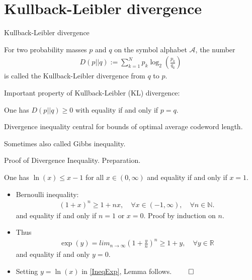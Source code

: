 \section{Kullback-Leibler divergence}
\begin{frame}{Kullback-Leibler divergence}
\begin{definition}
For two probability masses $p$ and $q$ on the symbol alphabet $\mathcal{A}$,  the number
\begin{align*}
D(p||q):=\sum_{k=1}^Np_k\log_2\left(\frac{p_k}{q_k}\right)
\end{align*}
is called the Kullback-Leibler divergence from $q$ to $p$. 
\end{definition}
Important property of Kullback-Leibler (KL) divergence: 
\begin{proposition}
One has $D(p||q)\geq 0$ with equality if and only if $p=q$.
\end{proposition}
\bit
\item Divergence inequality central for bounds of optimal average codeword length.
\item Sometimes also called Gibbs inequality. 
\eit
\end{frame}


\begin{frame}{Proof of Divergence Inequality. Preparation.}
\begin{lemma}
One has $\ln(x)\leq x-1$ for all $x\in(0,\infty)$ and equality if and only if $x=1$.
\end{lemma} 
\begin{itemize}
\item Bernoulli inequality: 
\begin{align*}
(1+x)^{n}\geq 1+nx,\quad \forall x\in(-1,\infty), \quad \forall n\in\mathbb{N}. 
\end{align*}
and equality if and only if $n=1$ or $x=0$. Proof by induction on $n$.
\item Thus 
\begin{align}\label{IneqExp}
\exp(y)=lim_{n\to\infty}\left(1+\frac{y}{n}\right)^{n}\geq 1+y,\quad \forall y\in\mathbb{R} 
\end{align}
and equality if and only $y=0$. 
\item Setting  $y=\ln(x)$ in \eqref{IneqExp}, Lemma follows. $\qed$
\end{itemize} 
\end{frame}



